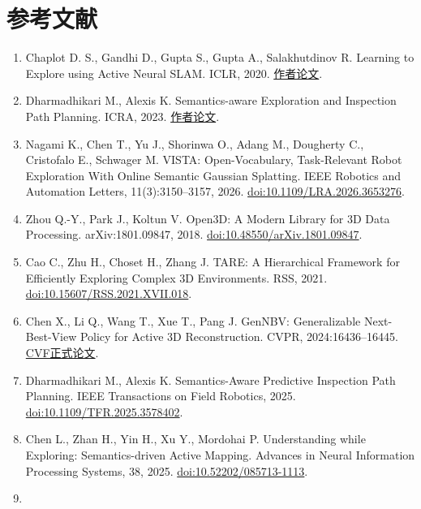 \documentclass[11pt,a4paper]{article}
\begin{document}
\hypertarget{ux53c2ux8003ux6587ux732e}{%
\section*{参考文献}\label{ux53c2ux8003ux6587ux732e}}

\begin{enumerate}
\def\labelenumi{\arabic{enumi}.}
\item
  Chaplot D. S., Gandhi D., Gupta S., Gupta A., Salakhutdinov R. Learning to Explore using Active Neural SLAM. ICLR, 2020. \href{https://arxiv.org/abs/2004.05155}{作者论文}.
\item
  Dharmadhikari M., Alexis K. Semantics-aware Exploration and Inspection Path Planning. ICRA, 2023. \href{https://arxiv.org/abs/2303.07236}{作者论文}.
\item
  Nagami K., Chen T., Yu J., Shorinwa O., Adang M., Dougherty C., Cristofalo E., Schwager M. VISTA: Open-Vocabulary, Task-Relevant Robot Exploration With Online Semantic Gaussian Splatting. IEEE Robotics and Automation Letters, 11(3):3150--3157, 2026. \href{https://doi.org/10.1109/LRA.2026.3653276}{doi:10.1109/LRA.2026.3653276}.
\item
  Zhou Q.-Y., Park J., Koltun V. Open3D: A Modern Library for 3D Data Processing. arXiv:1801.09847, 2018. \href{https://doi.org/10.48550/arXiv.1801.09847}{doi:10.48550/arXiv.1801.09847}.
\item
  Cao C., Zhu H., Choset H., Zhang J. TARE: A Hierarchical Framework for Efficiently Exploring Complex 3D Environments. RSS, 2021. \href{https://doi.org/10.15607/RSS.2021.XVII.018}{doi:10.15607/RSS.2021.XVII.018}.
\item
  Chen X., Li Q., Wang T., Xue T., Pang J. GenNBV: Generalizable Next-Best-View Policy for Active 3D Reconstruction. CVPR, 2024:16436--16445. \href{https://openaccess.thecvf.com/content/CVPR2024/html/Chen_GenNBV_Generalizable_Next-Best-View_Policy_for_Active_3D_Reconstruction_CVPR_2024_paper.html}{CVF正式论文}.
\item
  Dharmadhikari M., Alexis K. Semantics-Aware Predictive Inspection Path Planning. IEEE Transactions on Field Robotics, 2025. \href{https://doi.org/10.1109/TFR.2025.3578402}{doi:10.1109/TFR.2025.3578402}.
\item
  Chen L., Zhan H., Yin H., Xu Y., Mordohai P. Understanding while Exploring: Semantics-driven Active Mapping. Advances in Neural Information Processing Systems, 38, 2025. \href{https://doi.org/10.52202/085713-1113}{doi:10.52202/085713-1113}.
\item

\end{enumerate}
\end{document}
